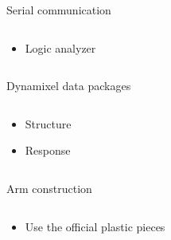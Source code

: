\documentclass{beamer}
\begin{document}

\begin{frame}{Serial communication}

    \begin{columns}
        \begin{column}[]{0.5\textwidth}
            \begin{itemize}
                \item Logic analyzer
            \end{itemize}
        \end{column}
        
        
        \begin{column}[]{0.5\textwidth}
        \end{column}
    \end{columns}
    
\end{frame}



\begin{frame}{Dynamixel data packages}

    \begin{columns}
        \begin{column}[]{0.5\textwidth}
            \begin{itemize}
                \item Structure
                \item Response
            \end{itemize}
        \end{column}
        
        
        \begin{column}[]{0.5\textwidth}
        \end{column}
    \end{columns}
    
\end{frame}


\begin{frame}{Arm construction}

    \begin{columns}
        \begin{column}[]{0.5\textwidth}
            \begin{itemize}
                \item Use the official plastic pieces
            \end{itemize}
        \end{column}
        
        
        \begin{column}[]{0.5\textwidth}
        \end{column}
    \end{columns}
    
\end{frame}
\end{document}
